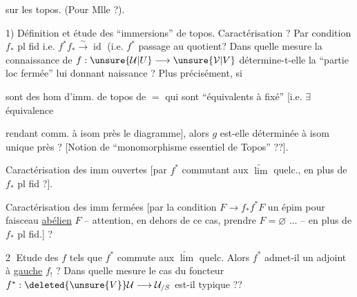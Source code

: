 
 sur les topos. (Pour Mlle  ?).

1) Définition et étude des ``immersions'' de topos.  Caractérisation ? Par condition \(f_*\) pl fid i.e. \(f^*f_*\xrightarrow{\sim}\operatorname{id}\) (i.e. \(f^*\) passage au quotient? Dans quelle mesure la  connaissance de \(f:\unsure{\mathcal U|U}\longrightarrow\unsure{\mathcal V|V}\) détermine-t-elle la ``partie loc fermée'' lui donnant naissance ? Plus précisément, si





sont des hom d'imm. de topos de \(=\)   qui sont ``équivalents à   fixé'' [i.e. \(\exists\) équivalence


rendant comm. à isom près le diagramme], alors \(g\) est-elle déterminée à isom unique près ? [Notion de ``monomorphisme essentiel de Topos'' ??].

Caractérisation des imm ouvertes [par \(f^*\) commutant aux \(\underleftarrow{\lim}\) quelc., en plus de \(f_*\) pl fid ?].


Caractérisation des imm fermées [par la condition \(F\longrightarrow f_*f^*F\) un épim pour  faisceau \uline{abélien} \(F\) -- attention,  en dehors de ce cas, prendre \(F=\varnothing\) \(\ldots\) -- en plus de \(f_*\) pl fid.] ?


\textcircled{2} Etude des \(f\) tels que \(f^*\) commute aux \(\underleftarrow{\lim}\) quelc. Alors \(f^*\)  admet-il un adjoint à \uline{gauche}  \(f_!\) ? Dans quelle mesure le cas du foncteur  \(f^*:\deleted{\unsure{V}}\mathcal U\longrightarrow\mathcal U_{/S}\) est-il typique ??


